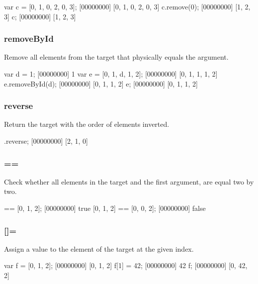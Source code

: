 \begin{urbiscript}[firstnumber=last]
var c = [0, 1, 0, 2, 0, 3];
[00000000] [0, 1, 0, 2, 0, 3]
c.remove(0);
[00000000] [1, 2, 3]
c;
[00000000] [1, 2, 3]
\end{urbiscript}

\subsubsection{removeById}

Remove all elements from the target that physically equals the
argument.

\begin{urbiscript}[firstnumber=last]
var d = 1;
[00000000] 1
var e = [0, 1, d, 1, 2];
[00000000] [0, 1, 1, 1, 2]
e.removeById(d);
[00000000] [0, 1, 1, 2]
e;
[00000000] [0, 1, 1, 2]
\end{urbiscript}

\subsubsection{reverse}

Return the target with the order of elements inverted.

\begin{urbiscript}[firstnumber=last]
[0, 1, 2].reverse;
[00000000] [2, 1, 0]
\end{urbiscript}

\subsubsection{==}

Check whether all elements in the target and the first argument, are
equal two by two.

\begin{urbiscript}[firstnumber=last]
[0, 1, 2] == [0, 1, 2];
[00000000] true
[0, 1, 2] == [0, 0, 2];
[00000000] false
\end{urbiscript}

\subsubsection{[]=}
\label{sec:std-list-setnth}

Assign a value to the element of the target at the given index.

\begin{urbiscript}[firstnumber=last]
var f = [0, 1, 2];
[00000000] [0, 1, 2]
f[1] = 42;
[00000000] 42
f;
[00000000] [0, 42, 2]
\end{urbiscript}

